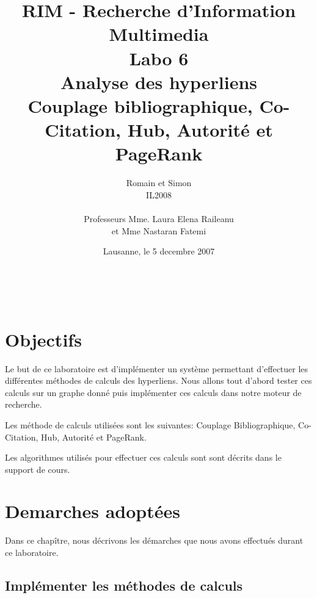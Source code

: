 \documentclass[a4paper, 11pt]{article}
\title{ %
\small{RIM - Recherche d'Information Multimedia} \\ \vspace{2cm}
\huge{Labo 6} \\ \vspace{1cm} 
Analyse des hyperliens\\
\small{Couplage bibliographique, Co-Citation, Hub, Autorité et PageRank}}
\author{Romain \bsc{de Wolff} et Simon \bsc{Hintermann}\\ IL2008 \\ \vspace{2cm} \\ Professeurs Mme. Laura Elena Raileanu \\ et Mme Nastaran Fatemi \vspace{2cm} 
}
\date{Lausanne, le 5 decembre 2007}  %
\begin{document}
\maketitle

\newpage
\tableofcontents
\newpage

\thispagestyle{empty} %
\newpage

\
 \setcounter{page}{1} 

{\setlength{\baselineskip}{1.2\baselineskip}}
\parskip=12pt
\section{Objectifs} 

Le but de ce laboratoire est d'implémenter un système permettant
d'effectuer les différentes méthodes de calculs des hyperliens. Nous allons
tout d'abord tester ces calculs sur un graphe donné puis implémenter ces
calculs dans notre moteur de recherche.

Les méthode de calculs utilisées sont les suivantes: Couplage Bibliographique, 
Co-Citation, Hub, Autorité et PageRank. 

Les algorithmes utilisés pour effectuer ces calculs sont sont décrits dans le support de cours.

\section{Demarches adoptées} 

Dans ce chapître, nous décrivons les démarches que nous avons effectués durant
ce laboratoire.

\subsection{Implémenter les méthodes de calculs}
\end{document}
